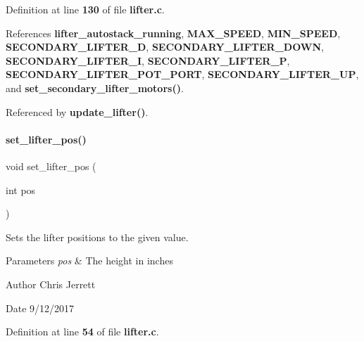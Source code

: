 Definition at line \textbf{ 130} of file \textbf{ lifter.\+c}.



References \textbf{ lifter\+\_\+autostack\+\_\+running}, \textbf{ M\+A\+X\+\_\+\+S\+P\+E\+ED}, \textbf{ M\+I\+N\+\_\+\+S\+P\+E\+ED}, \textbf{ S\+E\+C\+O\+N\+D\+A\+R\+Y\+\_\+\+L\+I\+F\+T\+E\+R\+\_\+D}, \textbf{ S\+E\+C\+O\+N\+D\+A\+R\+Y\+\_\+\+L\+I\+F\+T\+E\+R\+\_\+\+D\+O\+WN}, \textbf{ S\+E\+C\+O\+N\+D\+A\+R\+Y\+\_\+\+L\+I\+F\+T\+E\+R\+\_\+I}, \textbf{ S\+E\+C\+O\+N\+D\+A\+R\+Y\+\_\+\+L\+I\+F\+T\+E\+R\+\_\+P}, \textbf{ S\+E\+C\+O\+N\+D\+A\+R\+Y\+\_\+\+L\+I\+F\+T\+E\+R\+\_\+\+P\+O\+T\+\_\+\+P\+O\+RT}, \textbf{ S\+E\+C\+O\+N\+D\+A\+R\+Y\+\_\+\+L\+I\+F\+T\+E\+R\+\_\+\+UP}, and \textbf{ set\+\_\+secondary\+\_\+lifter\+\_\+motors()}.



Referenced by \textbf{ update\+\_\+lifter()}.

\mbox{\label{lifter_8c_abddc7cb502e12fa277b627c90a45efb1}} 
\paragraph{set\+\_\+lifter\+\_\+pos()}
{\footnotesize\ttfamily void set\+\_\+lifter\+\_\+pos (\begin{DoxyParamCaption}\item[{int}]{pos }\end{DoxyParamCaption})}



Sets the lifter positions to the given value. 


\begin{DoxyParams}{Parameters}
{\em pos} & The height in inches \\
\hline
\end{DoxyParams}
\begin{DoxyAuthor}{Author}
Chris Jerrett 
\end{DoxyAuthor}
\begin{DoxyDate}{Date}
9/12/2017 
\end{DoxyDate}


Definition at line \textbf{ 54} of file \textbf{ lifter.\+c}.

\mbox{\label{lifter_8c_ad00a195af30f246924d6e1a30095b882}} 
